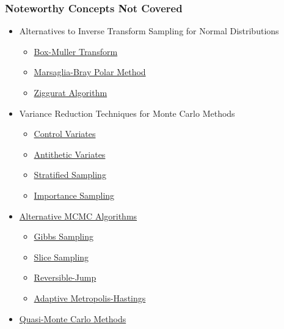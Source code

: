\documentclass{beamer}
\begin{document}
\begin{frame}
  \frametitle{Noteworthy Concepts Not Covered}
  \begin{itemize}
    \item Alternatives to Inverse Transform Sampling for Normal Distributions
    \begin{itemize}
      \item \href{https://en.wikipedia.org/wiki/Box–Muller_transform}{Box-Muller Transform}
      \item \href{https://en.wikipedia.org/wiki/Marsaglia_polar_method}{Marsaglia-Bray Polar Method}
      \item \href{https://en.wikipedia.org/wiki/Ziggurat_algorithm}{Ziggurat Algorithm}
    \end{itemize}
    \item Variance Reduction Techniques for Monte Carlo Methods
    \begin{itemize}
      \item \href{https://en.wikipedia.org/wiki/Control_variates}{Control Variates}
      \item \href{https://en.wikipedia.org/wiki/Antithetic_variates}{Antithetic Variates}
      \item \href{https://en.wikipedia.org/wiki/Stratified_sampling}{Stratified Sampling}
      \item \href{https://en.wikipedia.org/wiki/Importance_sampling}{Importance Sampling}
    \end{itemize}
    \item \href{https://en.wikipedia.org/wiki/Markov_chain_Monte_Carlo}{Alternative MCMC Algorithms}
    \begin{itemize}
      \item \href{https://en.wikipedia.org/wiki/Gibbs_sampling}{Gibbs Sampling}
      \item \href{https://en.wikipedia.org/wiki/Slice_sampling}{Slice Sampling}
      \item \href{https://en.wikipedia.org/wiki/Reversible-jump}{Reversible-Jump}
      \item \href{https://projecteuclid.org/euclid.bj/1080222083}{Adaptive Metropolis-Hastings}
    \end{itemize}
    \item \href{https://en.wikipedia.org/wiki/Quasi-Monte_Carlo_method}{Quasi-Monte Carlo Methods}
  \end{itemize}
\end{frame}
\end{document}
